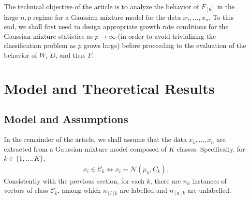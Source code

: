 \documentclass[twoside,11pt]{article}
\begin{document}
The technical objective of the article is to analyze the behavior of $F_{[u]}$ in the large $n,p$ regime for a Gaussian mixture model for the data $x_1,\ldots,x_n$. To this end, we shall first need to design appropriate growth rate conditions for the Gaussian mixture statistics as $p\to\infty$ (in order to avoid trivializing the classification problem as $p$ grows large) before proceeding to the evaluation of the behavior of $W$, $D$, and thus $F$.


\section{Model and Theoretical Results}
\label{sec:model}
\subsection{Model and Assumptions}
In the remainder of the article, we shall assume that the data $x_1,\ldots,x_n$ are extracted from a Gaussian mixture model composed of $K$ classes. Specifically, for $k\in\{1,\ldots,K\}$, 
\begin{align*}
	x_i\in \mathcal C_k \Leftrightarrow x_{i}\sim\mathcal N(\mu_{k},C_{k}).
\end{align*}
Consistently with the previous section, for each $k$, there are $n_{k}$ instances of vectors of class $\mathcal{C}_{k}$, among which $n_{[l]k}$ are labelled and $n_{[u]k}$ are unlabelled.
\end{document}
